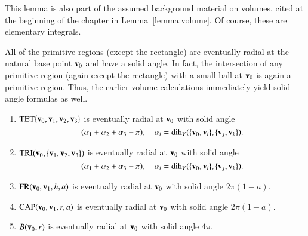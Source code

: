 This lemma is also part of the assumed background material on volumes,
cited at the beginning of the chapter in Lemma~\ref{lemma:volume}.
Of course, these are elementary integrals.







All of the primitive regions (except the rectangle) 
are eventually radial at the natural
base point ${\mathbf v}_0$ and have a
solid angle.  In fact, the intersection of any primitive region (again except
the rectangle) with a small ball at ${\mathbf v}_0$ is again a primitive region.  Thus,
the earlier volume calculations immediately yield solid angle formulas as well.
%

\begin{lemma} \label{lemma:prim-sol}
\begin{enumerate}
\item ${\operatorname{TET}}\{{\mathbf v}_0,{\mathbf v}_1,{\mathbf v}_2,{\mathbf v}_3\}$ is eventually radial at ${\mathbf v}_0$
with solid angle
\begin{displaymath}
(\alpha_1+\alpha_2+\alpha_3-\pi),\quad
\alpha_i=\operatorname{dih}_V(\{{\mathbf v}_0,{\mathbf v}_i\},\{{\mathbf v}_j,{\mathbf v}_k\}).
\end{displaymath}
\item  ${\operatorname{TRI}}({\mathbf v}_0,\{{\mathbf v}_1,{\mathbf v}_2,{\mathbf v}_3\})$ is eventually radial at ${\mathbf v}_0$
with solid angle 
\begin{displaymath}
(\alpha_1+\alpha_2+\alpha_3-\pi),\quad
\alpha_i=\operatorname{dih}_V(\{{\mathbf v}_0,{\mathbf v}_i\},\{{\mathbf v}_j,{\mathbf v}_k\}).
\end{displaymath}
\item ${\operatorname{FR}}({\mathbf v}_0,{\mathbf v}_1,h,a)$ is eventually radial at ${\mathbf v}_0$ with solid
angle        $2\pi (1-a)$.
\item ${\operatorname{CAP}}({\mathbf v}_0,{\mathbf v}_1,r,a)$ is eventually radial at ${\mathbf v}_0$ with solid
angle 
$2\pi(1-a)$.
\item $B({\mathbf v}_0,r)$ is eventually radial at ${\mathbf v}_0$ with solid
angle 
$4\pi$.
%
\end{enumerate}
\end{lemma}
%
%
%
%

